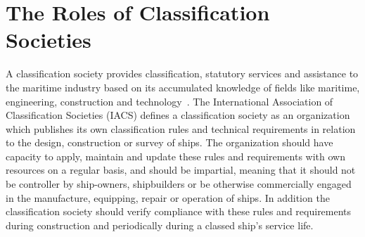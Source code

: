 % 

\section{The Roles of Classification Societies}
A classification society provides classification, statutory services and assistance to the maritime industry based on its accumulated knowledge of fields like
maritime, engineering, construction and technology~\citep{Hormann2006}.
The International Association of Classification Societies (IACS) defines a classification society as an organization which
publishes its own classification rules and technical requirements in relation to the design, construction or survey of ships. 
The organization should have capacity to apply, maintain and update these rules and requirements with own resources on a regular basis, and should 
be impartial, meaning that it should not be controller by ship-owners, shipbuilders or be otherwise commercially engaged in the manufacture, 
equipping, repair or operation of ships.
In addition the classification society should verify compliance with these rules and requirements during construction and periodically during a classed
ship's service life. 

